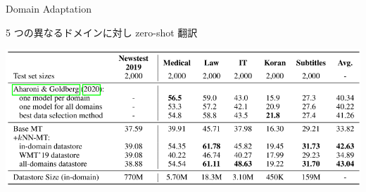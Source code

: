 \documentclass[unicode, 12pt, xdvipdfmx, aspectratio=43]{beamer}
\begin{document}
\begin{frame}[label={sec:org7c61fc5}]{Domain Adaptation}
\begin{block}{5 つの異なるドメインに対し zero-shot 翻訳}
\begin{center}
\includegraphics[width=\linewidth]{./figure/Table3.pdf}
\end{center}
\end{block}
\end{frame}
\end{document}
